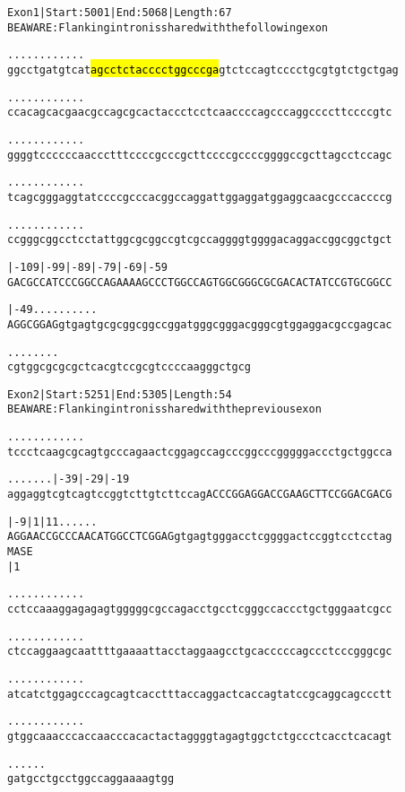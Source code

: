 \documentclass{article}
\begin{document}
\begin{alltt}
Exon 1 | Start: 5001 | End: 5068 | Length: 67
BE AWARE: Flanking intron is shared with the following exon

.    .    .    .    .    .    .    .    .    .    .    .    
ggcctgatgtcat\hl{agcctctacccctggcccga}gtctccagtcccctgcgtgtctgctgag

.    .    .    .    .    .    .    .    .    .    .    .    
ccacagcacgaacgccagcgcactaccctcctcaaccccagcccaggccccttccccgtc

.    .    .    .    .    .    .    .    .    .    .    .    
ggggtccccccaaccctttccccgcccgcttccccgccccggggccgcttagcctccagc

.    .    .    .    .    .    .    .    .    .    .    .    
tcagcgggaggtatccccgcccacggccaggattggaggatggaggcaacgcccaccccg

.    .    .    .    .    .    .    .    .    .    .    .    
ccgggcggcctcctattggcgcggccgtcgccaggggtggggacaggaccggcggctgct

  |-109     |-99      |-89      |-79      |-69      |-59    
GACGCCATCCCGGCCAGAAAAGCCCTGGCCAGTGGCGGGCGCGACACTATCCGTGCGGCC

  |-49      .    .    .    .    .    .    .    .    .    .  
AGGCGGAGgtgagtgcgcggcggccggatgggcgggacgggcgtggaggacgccgagcac

  .    .    .    .    .    .    .    .
cgtggcgcgcgctcacgtccgcgtccccaagggctgcg
\end{alltt}
\newpage
\begin{alltt}
Exon 2 | Start: 5251 | End: 5305 | Length: 54
BE AWARE: Flanking intron is shared with the previous exon

.    .    .    .    .    .    .    .    .    .    .    .    
tccctcaagcgcagtgcccagaactcggagccagcccggcccgggggaccctgctggcca

.    .    .    .    .    .    .    |-39      |-29      |-19 
aggaggtcgtcagtccggtcttgtcttccagACCCGGAGGACCGAAGCTTCCGGACGACG

     |-9      |1        |11   .    .    .    .    .    .    
AGGAACCGCCCAACATGGCCTCGGAGgtgagtgggacctcggggactccggtcctcctag
              M  A  S  E                                    
              |1                                            

.    .    .    .    .    .    .    .    .    .    .    .    
cctccaaaggagagagtgggggcgccagacctgcctcgggccaccctgctgggaatcgcc

.    .    .    .    .    .    .    .    .    .    .    .    
ctccaggaagcaattttgaaaattacctaggaagcctgcacccccagccctcccgggcgc

.    .    .    .    .    .    .    .    .    .    .    .    
atcatctggagcccagcagtcacctttaccaggactcaccagtatccgcaggcagccctt

.    .    .    .    .    .    .    .    .    .    .    .    
gtggcaaacccaccaacccacactactaggggtagagtggctctgccctcacctcacagt

.    .    .    .    .    .
gatgcctgcctggccaggaaaagtgg
\end{alltt}
\end{document}
